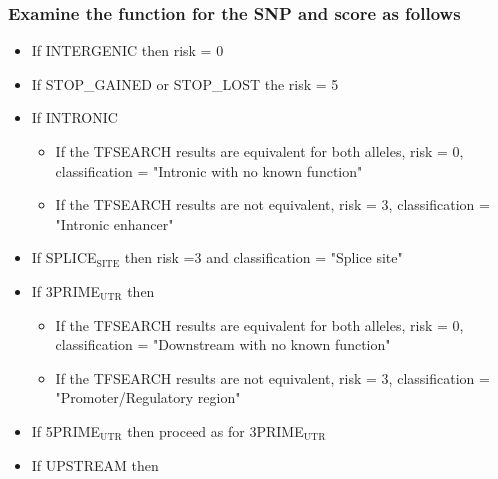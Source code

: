 \documentclass[11pt]{article}
\begin{document}
\subsubsection{Examine the function for the SNP and score as follows}
\label{sec-3_4_2}
\begin{itemize}

\item If INTERGENIC then risk = 0\\
\label{sec-3_4_2_1}%
\item If STOP\_GAINED or STOP\_LOST the risk = 5\\
\label{sec-3_4_2_2}%
\item If INTRONIC\\
\label{sec-3_4_2_3}%
\begin{itemize}

\item If the TFSEARCH results are equivalent for both alleles, risk = 0, classification = "Intronic with no known function"\\
\label{sec-3_4_2_3_1}%
\item If the TFSEARCH results are not equivalent, risk = 3, classification = "Intronic enhancer"\\
\label{sec-3_4_2_3_2}%
\end{itemize} %

\item If SPLICE$_{\mathrm{SITE}}$ then risk =3 and classification = "Splice site"\\
\label{sec-3_4_2_4}%
\item If 3PRIME$_{\mathrm{UTR}}$ then\\
\label{sec-3_4_2_5}%
\begin{itemize}

\item If the TFSEARCH results are equivalent for both alleles, risk = 0, classification = "Downstream with no known function"\\
\label{sec-3_4_2_5_1}%
\item If the TFSEARCH results are not equivalent, risk = 3, classification = "Promoter/Regulatory region"\\
\label{sec-3_4_2_5_2}%
\end{itemize} %

\item If 5PRIME$_{\mathrm{UTR}}$ then proceed as for 3PRIME$_{\mathrm{UTR}}$\\
\label{sec-3_4_2_6}%
\item If UPSTREAM then\\
\label{sec-3_4_2_7}%
\begin{itemize}


\end{itemize}
\end{itemize}
\end{document}
